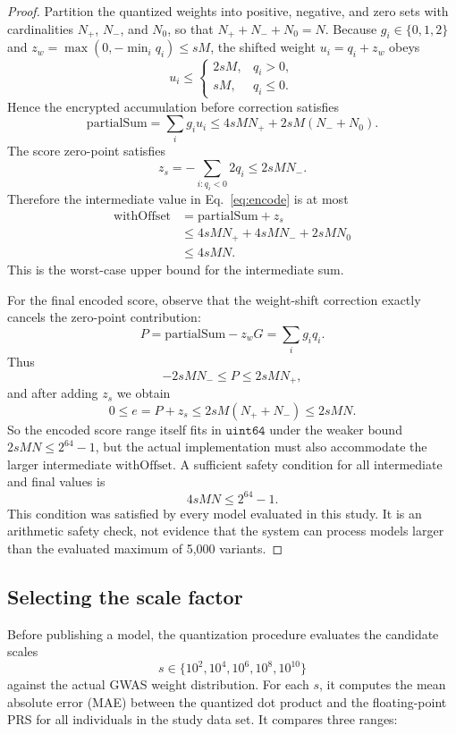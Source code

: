 \documentclass[10pt]{article}
\begin{document}
{\renewcommand{\qedsymbol}{}
\begin{proof}
Partition the quantized weights into positive, negative, and zero sets with
cardinalities $N_{+}$, $N_{-}$, and $N_{0}$, so that $N_{+}+N_{-}+N_{0}=N$.
Because $g_i \in \{0,1,2\}$ and $z_w=\max(0,-\min_i q_i) \leq sM$, the shifted weight
$u_i = q_i + z_w$ obeys
\[
u_i \leq
\begin{cases}
2 s M, & q_i > 0,\\
s M, & q_i \leq 0.
\end{cases}
\]
Hence the encrypted accumulation before correction satisfies
\[
\mathrm{partialSum} = \sum_i g_i u_i
\leq 4 s M N_{+} + 2 s M (N_{-}+N_{0}).
\]
The score zero-point satisfies
\[
z_s = -\sum_{i:q_i<0} 2 q_i \leq 2 s M N_{-}.
\]
Therefore the intermediate value in Eq.~\ref{eq:encode} is at most
\begin{align*}
\mathrm{withOffset} &= \mathrm{partialSum} + z_s \\
&\leq 4sMN_{+}+4sMN_{-}+2sMN_{0} \\
&\leq 4sMN.
\end{align*}
This is the worst-case upper bound for the intermediate sum.

For the final encoded score, observe that the weight-shift correction exactly
cancels the zero-point contribution:
\[
P = \mathrm{partialSum} - z_w G = \sum_i g_i q_i.
\]
Thus
\[
-2 s M N_{-} \leq P \leq 2 s M N_{+},
\]
and after adding $z_s$ we obtain
\[
0 \leq e = P + z_s \leq 2 s M (N_{+}+N_{-}) \leq 2 s M N.
\]
So the encoded score range itself fits in $\texttt{uint64}$ under the weaker bound
$2 s M N \leq 2^{64}-1$, but the actual implementation must also accommodate the
larger intermediate $\mathrm{withOffset}$.  A sufficient safety condition for all
intermediate and final values is
\[
4 s M N \leq 2^{64}-1.
\]
This condition was satisfied by every model evaluated in this study.  It is an
arithmetic safety check, not evidence that the system can process models larger than
the evaluated maximum of 5,000 variants.
\end{proof}}

\subsection{Selecting the scale factor}
\label{sec:advisor}

Before publishing a model, the quantization procedure evaluates the candidate scales
\[
s \in \{10^2,10^4,10^6,10^8,10^{10}\}
\]
against the actual GWAS weight distribution.  For each $s$, it computes the mean absolute error
(MAE) between the quantized dot product and the floating-point PRS for all
individuals in the study data set.  It compares three ranges:
\end{document}
